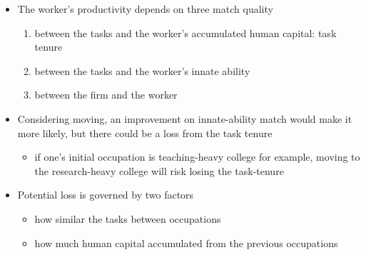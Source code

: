\documentclass[10pt,svgnames,fragile]{beamer}
\begin{document}
{\begin{frame}
\begin{itemize}
		\item The worker's productivity depends on three match quality 
	\begin{enumerate}
		\vspace{1 mm}
	\item between the tasks and the worker's accumulated human capital: task tenure
		\vspace{1 mm}
	\item  between the tasks and  the worker's innate ability
	\vspace{1 mm}
	\item between the firm and the worker
\end{enumerate}
\vfill
	\item Considering moving, an improvement on innate-ability match would make it more likely, but there could be a loss from the task tenure 
	\begin{itemize}
		\item if one’s initial occupation is teaching-heavy college for example, moving to the research-heavy college will risk losing the task-tenure
	\end{itemize}
\vfill
	\item Potential loss is governed by two factors
	\begin{itemize}
		\item how similar the tasks between occupations
		\item how much human capital accumulated from the previous occupations
	\end{itemize}
\vfill
\end{itemize}
\end{frame}



}
\end{document}
